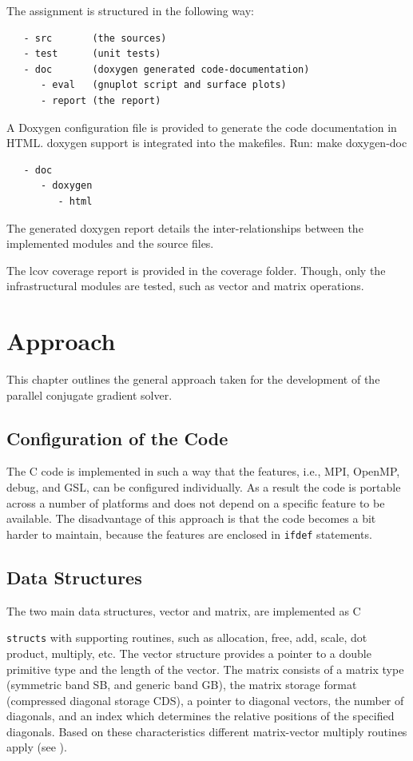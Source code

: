 \documentclass[12pt,a4paper]{report}
\def\ccode#1{
  \lstinline[basicstyle=\ttfamily,language=C]{#1} }
\begin{document}
The assignment is structured in the following way:
\begin{verbatim}
   - src       (the sources)
   - test      (unit tests)
   - doc       (doxygen generated code-documentation)
      - eval   (gnuplot script and surface plots)
      - report (the report)
\end{verbatim}

A Doxygen configuration file is provided to generate the code
documentation in HTML. doxygen support is integrated into the
makefiles.  Run: make doxygen-doc

\begin{verbatim}
   - doc
      - doxygen
         - html
\end{verbatim}

The generated doxygen report details the inter-relationships between
the implemented modules and the source files.

The lcov coverage report is provided in the coverage folder. Though,
only the infrastructural modules are tested, such as vector and matrix
operations.

\chapter{Approach}
\label{cha:approach}

This chapter outlines the general approach taken for the development
of the parallel conjugate gradient solver.

\section{Configuration of the Code}
\label{sec:configuration-code}

The C code is implemented in such a way that the features, i.e., MPI,
OpenMP, debug, and GSL, can be configured individually. As a result
the code is portable across a number of platforms and does not depend
on a specific feature to be available. The disadvantage of this
approach is that the code becomes a bit harder to maintain, because
the features are enclosed in \ccode{ifdef} statements.

\section{Data Structures}
\label{sec:data-structures}

The two main data structures, vector and matrix, are implemented as C
\ccode{structs} with supporting routines, such as allocation, free,
add, scale, dot product, multiply, etc. The vector structure provides
a pointer to a double primitive type and the length of the vector. The
matrix consists of a matrix type (symmetric band SB, and generic band
GB), the matrix storage format (compressed diagonal storage CDS), a
pointer to diagonal vectors, the number of diagonals, and an index
which determines the relative positions of the specified
diagonals. Based on these characteristics different matrix-vector
multiply routines apply (see ).
\end{document}
